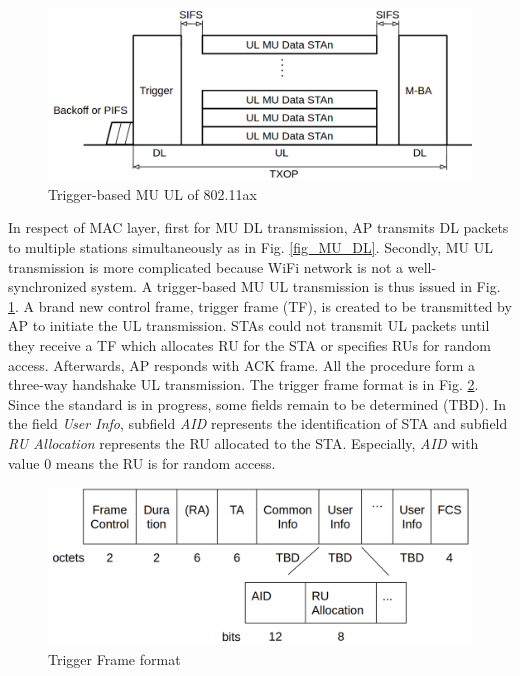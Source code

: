 \documentclass[journal]{IEEEtran}
\begin{document}
\begin{figure}[!t]
\includegraphics[scale=0.21]{./figure/Section_preliminary/fig_MU_UL.png}
\caption{Trigger-based MU UL of 802.11ax}
\label{fig_MU_UL}
\end{figure}

In respect of MAC layer, first for MU DL transmission, AP transmits DL packets to multiple stations simultaneously as in Fig. \ref{fig_MU_DL}.
Secondly, MU UL transmission is more complicated because WiFi network is not a well-synchronized system. 
A trigger-based MU UL transmission is thus issued in Fig. \ref{fig_MU_UL}.
A brand new control frame, trigger frame (TF), is created to be transmitted by AP to initiate the UL transmission.
STAs could not transmit UL packets until they receive a TF which allocates RU for the STA or specifies RUs for random access. 
Afterwards, AP responds with ACK frame. All the procedure form a three-way handshake UL transmission. 
The trigger frame format is in Fig. \ref{fig_TF_format}. 
Since the standard is in progress, some fields remain to be determined (TBD). 
In the field \textit{User Info}, subfield \textit{AID} represents the identification of STA and subfield \textit{RU Allocation} represents the RU allocated to the STA.
Especially, \textit{AID} with value 0 means the RU is for random access.


\begin{figure}[!t]
\includegraphics[scale=0.2]{./figure/Section_preliminary/fig_tf_format.png}
\caption{Trigger Frame format}
\label{fig_TF_format}
\end{figure}
\end{document}

